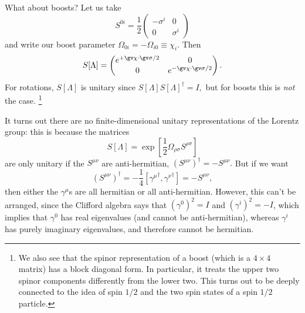 What about boosts? Let us take
$$S^{0i}=\frac{1}{2}\begin{pmatrix}
-\sigma^i & 0\\
0&\sigma^i
\end{pmatrix}$$
and write our boost parameter $\Omega_{0i}=-\Omega_{i0}\equiv \chi_i.$ Then
$$S[\Lambda]=\begin{pmatrix}
    e^{+\gv \chi \cdot \gv\sigma/2} & 0\\
    0&e^{-\gv \chi \cdot \gv\sigma/2}
\end{pmatrix}.$$
For rotations, $S[\Lambda]$ is unitary since $S[\Lambda]S[\Lambda]^\dagger =I,$ but for boosts this is \emph{not} the case.%
    \footnote{We also see that the spinor representation of a boost (which is a $4\times 4$ matrix) has a block diagonal form. In particular, it treats the upper two spinor components differently from the lower two. This turns out to be deeply connected to the idea of spin $1/2$ and the two spin states of a spin $1/2$ particle.}

It turns out there are no finite-dimensional unitary representations of the Lorentz group: this is because the matrices
$$S[\Lambda]=\exp\left[\frac{1}{2}\Omega_{\rho\sigma} S^{\rho\sigma}\right]$$ are only unitary if the $S^{\mu\nu}$ are anti-hermitian, $(S^{\mu\nu})^\dagger=-S^{\mu\nu}.$ But if we want
\begin{equation}
    (S^{\mu\nu})^\dagger=-\frac{1}{4}[{\gamma^\mu}^\dagger,{\gamma^\nu}^\dagger] = -S^{\mu\nu},
\end{equation}
then either the $\gamma^\mu$s are all hermitian or all anti-hermitian. However, this can't be arranged, since the Clifford algebra says that $(\gamma^0)^2=I$ and $(\gamma^i)^2 = -I$, which implies that $\gamma^0$ has real eigenvalues (and cannot be anti-hermitian), whereas $ \gamma^i$ has purely imaginary eigenvalues, and therefore cannot be hermitian.